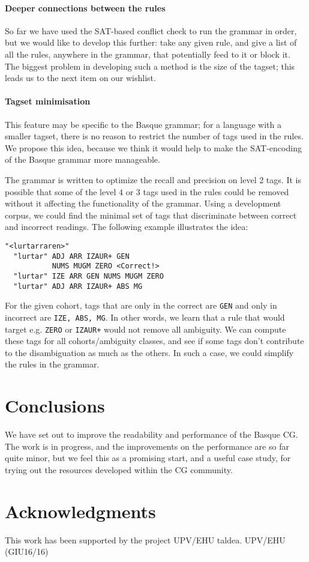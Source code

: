 \documentclass[11pt]{article}
\def\t#1{\texttt{#1}}
\begin{document}
\paragraph{Deeper connections between the rules} So far we have used the
  SAT-based conflict check to run the grammar in order, but we would
  like to develop this further: take any given rule, and give a list
  of all the rules, anywhere in the grammar, that potentially feed to
  it or block it. The biggest problem in developing such a method is
  the size of the tagset; this leads us to the next item on our wishlist. 
\paragraph{Tagset minimisation} This feature may be specific to the
Basque grammar; for a language with a smaller tagset, there is no
reason to restrict the number of tags used in the rules. We propose
this idea, because we think it would help to make the SAT-encoding
of the Basque grammar more manageable.

The grammar is written to optimize the recall and precision on level 2
tags. It is possible that some of the level 4 or 3 tags used in the
rules could be removed without it affecting the functionality of the
grammar. Using a development corpus, we could find the minimal set of
tags that discriminate between correct and incorrect readings. The
following example illustrates the idea:

\begin{verbatim}
"<lurtarraren>"
  "lurtar" ADJ ARR IZAUR+ GEN 
           NUMS MUGM ZERO <Correct!>
  "lurtar" IZE ARR GEN NUMS MUGM ZERO 
  "lurtar" ADJ ARR IZAUR+ ABS MG
\end{verbatim}

\noindent For the given cohort, tags that are only in the correct are \t{GEN} and only in incorrect are \t{IZE, ABS, MG}.
In other words, we learn that a rule that would target e.g. \t{ZERO} or \t{IZAUR+} would not remove all ambiguity.
We can compute these tags for all cohorts/ambiguity classes, and see
if some tags don't contribute to the disambiguation as much as the
others. In such a case, we could simplify the rules in the grammar.


\section{Conclusions}

We have set out to improve the readability and performance of the
Basque CG. The work is in progress, and the improvements on the
performance are so far quite minor, but we feel this as a promising
start, and a useful case study, for trying out the resources developed
within the CG community.


\section*{Acknowledgments}

This work has been supported by the project UPV/EHU taldea. UPV/EHU (GIU16/16)



\newpage



\end{document}
